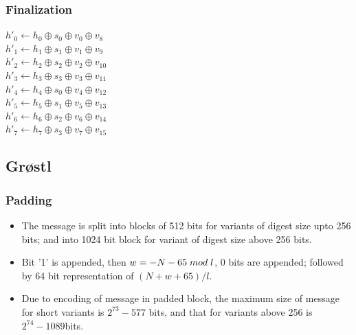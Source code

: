 \documentclass{beamer}
\begin{document}
\begin{frame}
\frametitle{Finalization}
$h'_{0} \gets h_{0} \oplus s_{0} \oplus v_{0} \oplus v_{8}$ \\
$h'_{1} \gets h_{1} \oplus s_{1} \oplus v_{1} \oplus v_{9}$ \\
$h'_{2} \gets h_{2} \oplus s_{2} \oplus v_{2} \oplus v_{10}$ \\
$h'_{3} \gets h_{3} \oplus s_{3} \oplus v_{3} \oplus v_{11}$ \\
$h'_{4} \gets h_{4} \oplus s_{0} \oplus v_{4} \oplus v_{12}$ \\
$h'_{5} \gets h_{5} \oplus s_{1} \oplus v_{5} \oplus v_{13}$ \\
$h'_{6} \gets h_{6} \oplus s_{2} \oplus v_{6} \oplus v_{14}$ \\
$h'_{7} \gets h_{7} \oplus s_{3} \oplus v_{7} \oplus v_{15}$ \\
\end{frame}

\subsection{Gr{\o}stl}

\begin{frame}
\frametitle{Padding}
\begin{itemize}
\item The message is split into blocks of 512 bits for variants of digest size upto 256 bits; and into 1024 bit
block for variant of digest size above 256 bits.
\item Bit '1' is appended, then $ w = -N - 65 \thickspace mod \thickspace l $, 0 bits are appended; followed by
64 bit representation of $(N + w + 65) / l $.
\item Due to encoding of message in padded block, the maximum size of message for short variants is $2^{73}-577$
bits, and that for variants above 256 is $2^{74}-1089$bits.
\end{itemize}
\end{frame}
\end{document}
